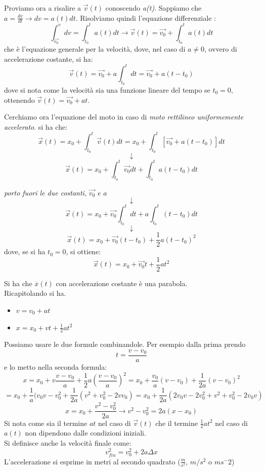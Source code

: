 \documentclass[a4paper,12pt, oneside]{book}
\begin{document}
\begin{shaded}
Proviamo ora a risalire a $\vec{v}(t)$ conoscendo \textit{a(t)}. Sappiamo che $a=\frac{dv}{dt}\rightarrow dv=a(t) dt$. Risolviamo quindi l'equazione differenziale :
$$\int_{\vec{v_0}}^v dv = \int_{t_0}^t a(t) dt\rightarrow \vec{v}(t)=\vec{v_0}+\int_{t_0}^t a(t) dt$$
che è l'equazione generale per la velocità, dove, nel caso di $a\neq 0$, ovvero di accelerazione costante, si ha:
$$\vec{v}(t)=\vec{v_0}+a\int_{t_0}^t dt=\vec{v_0}+a (t-t_0)$$
dove si nota come la velocità sia una funzione lineare del tempo se $t_0=0$, ottenendo $\vec{v}(t)=\vec{v_0}+a t$.
\end{shaded}
Cerchiamo ora l'equazione del moto in caso di\textit{ moto rettilineo uniformemente accelerato}.
si ha che: 
$$\vec{x}(t)=x_0+\int_{t_0}^t \vec{v}(t) dt= x_0+\int_{t_0}^t [\vec{v_0}+a (t-t_0)] dt$$
$$\downarrow$$
$$\vec{x}(t)=x_0+\int_{t_0}^t \vec{v_0} dt +\int_{t_0}^t a (t-t_0) dt$$
\begin{center}
\textit{porto fuori le due costanti, }$\vec{v_0}\,\, e\,\, a$
$$\downarrow$$
$$\vec{x}(t)=x_0+\vec{v_0} \int_{t_0}^t dt +a \int_{t_0}^t (t-t_0) dt$$
$$\downarrow$$
$$\vec{x}(t)=x_0+\vec{v_0} (t-t_0)+\frac{1}{2} a  (t-t_0)^2$$
dove, se si ha $t_0=0$, si ottiene:
$$\vec{x}(t)=x_0+\vec{v_0} t+\frac{1}{2} a  t^2$$
\end{center}
Si ha che $\overline{x}(t)$ con accelerazione costante è una parabola.\\
Ricapitolando si ha.
\begin{itemize}
\item $v=v_0+at$
\item $x=x_0+vt+\frac{1}{2}at^2$
\end{itemize}
Possiamo usare le due formule combinandole. Per esempio dalla prima prendo $$t=\frac{v-v_0}{a}$$ e lo metto nella seconda formula:
$$x=x_0+v\frac{v-v_0}{a}+\frac{1}{2}a \left(\frac{v-v_0}{a}\right)^2=x_0+\frac{v_0}{a}(v-v_0)+\frac{1}{2a}(v-v_0)^2$$
$$=x_0+\frac{1}{a}(v_0v-v_0^2+\frac{1}{2a}(v^2+v_0^2-2vv_0)=x_0+\frac{1}{2a}(2v_0v-2v_0^2+v^2+v_0^2-2v_0v)$$
$$x=x_0+\frac{v^2-v_0^2}{2a}\to v^2-v_0^2=2a(x-x_0)$$
Si nota come sia il termine $a t$ nel caso di $\vec{v}(t)$ che il termine $\frac{1}{2} a  t^2$ nel caso di $a(t)$ non dipendono dalle condizioni iniziali.\\
Si definisce anche la velocità finale come:
$$v_{fin}^2=v_0^2+2a\Delta x$$
L'accelerazione si esprime in metri al secondo quadrato ($\frac{m}{s^2}$, $m/s^2$ o $ms^-2$)
\end{document}
